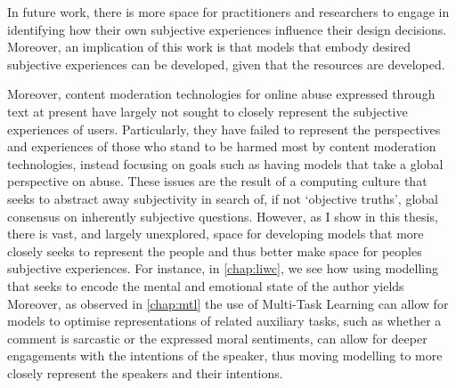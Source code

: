 In future work, there is more space for practitioners and researchers to engage in identifying how their own subjective experiences influence their design decisions.
Moreover, an implication of this work is that models that embody desired subjective experiences can be developed, given that the resources  are developed.

Moreover, content moderation technologies for online abuse expressed through text at present have largely not sought to closely represent the subjective experiences of users.
Particularly, they have failed to represent the perspectives and experiences of those who stand to be harmed most by content moderation technologies, instead focusing on goals such as having models that take a global perspective on abuse.
These issues are the result of a computing culture that seeks to abstract away subjectivity in search of, if not `objective truths', global consensus on inherently subjective questions.
However, as I show in this thesis, there is vast, and largely unexplored, space for developing models that more closely seeks to represent the people and thus better make space for peoples subjective experiences.
For instance, in \cref{chap:liwc}, we see how using modelling that seeks to encode the mental and emotional state of the author yields 
Moreover, as observed in \cref{chap:mtl} the use of Multi-Task Learning can allow for models to optimise representations of related auxiliary tasks, such as whether a comment is sarcastic or the expressed moral sentiments, can allow for deeper engagements with the intentions of the speaker, thus moving modelling to more closely represent the speakers and their intentions.

